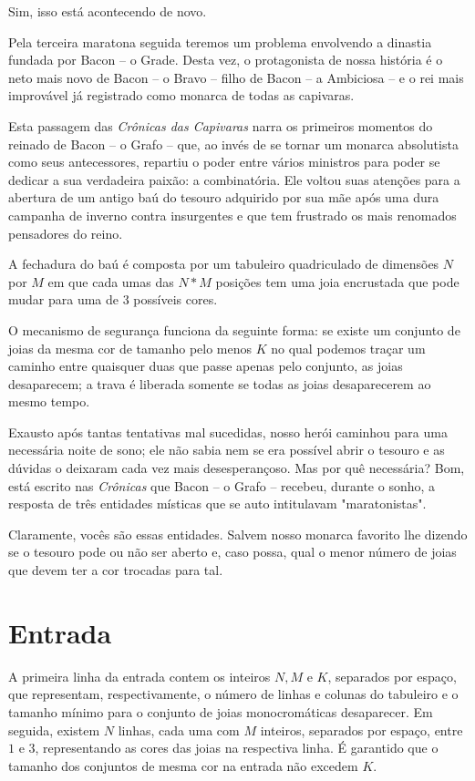 Sim, isso está acontecendo de novo.

Pela terceira maratona seguida teremos um problema envolvendo a dinastia fundada por Bacon -- o Grade.
Desta vez, o protagonista de nossa história é o neto mais novo de Bacon -- o Bravo -- filho de Bacon -- a Ambiciosa -- e o rei mais improvável já registrado como monarca de todas as capivaras.

Esta passagem das \textit{Crônicas das Capivaras} narra os primeiros momentos do reinado de Bacon -- o Grafo -- que, ao invés de se tornar um monarca absolutista como seus antecessores, repartiu o poder entre vários ministros para poder se dedicar a sua verdadeira paixão: a combinatória. Ele voltou suas atenções para a abertura de um antigo baú do tesouro adquirido por sua mãe após uma dura campanha de inverno contra insurgentes e que tem frustrado os mais renomados pensadores do reino.

A fechadura do baú é composta por um tabuleiro quadriculado de dimensões $N$ por $M$ em que cada umas das $N*M$ posições tem uma joia encrustada que pode mudar para uma de $3$ possíveis cores.

O mecanismo de segurança funciona da seguinte forma: se existe um conjunto de joias da mesma cor de tamanho pelo menos $K$ no qual podemos traçar um caminho entre quaisquer duas que passe apenas pelo conjunto, as joias desaparecem; a trava é liberada somente se todas as joias desaparecerem ao mesmo tempo.

Exausto após tantas tentativas mal sucedidas, nosso herói caminhou para uma necessária noite de sono; ele não sabia nem se era possível abrir o tesouro e as dúvidas o deixaram cada vez mais desesperançoso.
Mas por quê necessária?
Bom, está escrito nas \textit{Crônicas} que Bacon -- o Grafo -- recebeu, durante o sonho, a resposta de três entidades místicas que se auto intitulavam "maratonistas".

Claramente, vocês são essas entidades. Salvem nosso monarca favorito lhe dizendo se o tesouro pode ou não ser aberto e, caso possa, qual o menor número de joias que devem ter a cor trocadas para tal.


\section*{Entrada}

A primeira linha da entrada contem os inteiros $N, M$ e $K$, separados por espaço, que representam, respectivamente, o número de linhas e colunas do tabuleiro e o tamanho mínimo para o conjunto de joias monocromáticas desaparecer.
Em seguida, existem $N$ linhas, cada uma com $M$ inteiros, separados por espaço, entre $1$ e $3$, representando as cores das joias na respectiva linha.
É garantido que o tamanho dos conjuntos de mesma cor na entrada não excedem $K$.

